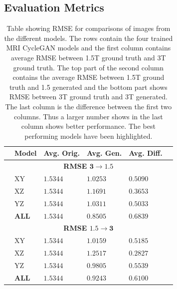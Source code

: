 \documentclass[12pt, fleqn, titlepage]{article}
\newcommand{\1}[1]{\mathds{1}\left[#1\right]}
\begin{document}
\subsection{Evaluation Metrics}\label{result_evaluation_metrics}
\begin{table}[H]
	\begin{center}
		\begin{tabular}{l l l l l l}
			\toprule
			& \textbf{Model} & \textbf{Avg. Orig.} & \textbf{Avg. Gen.} & \textbf{Avg. Diff.} & \\ \midrule
			&              \multicolumn{4}{c}{\textbf{RMSE $\mathbf{3\rightarrow1.5}$}}         & \\
			&XY                & $1.5344$            & $1.0253$           & $0.5090$            & \\
			&XZ                & $1.5344$            & $1.1691$           & $0.3653$            & \\
			&YZ                & $1.5344$            & $1.0311$           & $0.5033$            & \\
			&\textbf{ALL}               & $\mathbf{1.5344}$            & $\mathbf{0.8505}$           & $\mathbf{0.6839}$            & \\
			&            \multicolumn{4}{c}{\textbf{RMSE $\mathbf{1.5\rightarrow3}$}}           & \\
			&XY                & $1.5344$            & $1.0159$           & $0.5185$            & \\
			&XZ                & $1.5344$            & $1.2517$			  & $0.2827$            & \\
			&YZ                & $1.5344$            & $0.9805$           & $0.5539$            & \\
			&\textbf{ALL}               & $\mathbf{1.5344}$            & $\mathbf{0.9243}$           & $\mathbf{0.6100}$            & \\
			 \bottomrule
		\end{tabular}
		\caption{Table showing RMSE for comparisons of images from the different models. The rows contain the four trained MRI CycleGAN models and the first column contains average RMSE between 1.5T ground truth and 3T ground truth. The top part of the second column contains the average RMSE between 1.5T ground truth and 1.5 generated and the bottom part shows RMSE between 3T ground truth and 3T generated. The last column is the difference between the first two columns. Thus a larger number shows in the last column shows better performance. The best performing models have been highlighted.}
		\label{tab:metrics_rmse}
	\end{center}
\end{table}
\end{document}
